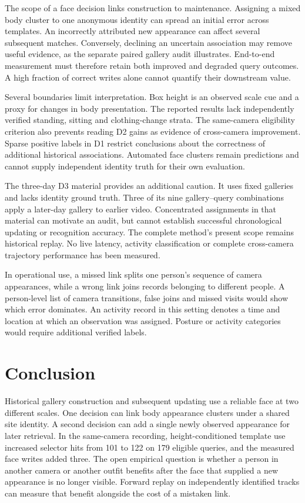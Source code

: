 \documentclass[journal,letterpaper]{IEEEtran}
\newcommand{\draftnote}[3]{\par\smallskip\noindent{\footnotesize
  \textcolor{editink}{\sffamily\bfseries [#2 #1]}\enspace
  \textcolor{editink}{#3}\par}\smallskip}
\newcommand{\expgap}[2]{\draftnote{EXPERIMENT}{#1}{#2}}
\begin{document}
The scope of a face decision links construction to maintenance. Assigning a mixed body cluster to one anonymous identity can spread an initial error across templates. An incorrectly attributed new appearance can affect several subsequent matches. Conversely, declining an uncertain association may remove useful evidence, as the separate paired gallery audit illustrates. End-to-end measurement must therefore retain both improved and degraded query outcomes. A high fraction of correct writes alone cannot quantify their downstream value.

Several boundaries limit interpretation. Box height is an observed scale cue and a proxy for changes in body presentation. The reported results lack independently verified standing, sitting and clothing-change strata. The same-camera eligibility criterion also prevents reading D2 gains as evidence of cross-camera improvement. Sparse positive labels in D1 restrict conclusions about the correctness of additional historical associations. Automated face clusters remain predictions and cannot supply independent identity truth for their own evaluation.

The three-day D3 material provides an additional caution. It uses fixed galleries and lacks identity ground truth. Three of its nine gallery--query combinations apply a later-day gallery to earlier video. Concentrated assignments in that material can motivate an audit, but cannot establish successful chronological updating or recognition accuracy. The complete method's present scope remains historical replay. No live latency, activity classification or complete cross-camera trajectory performance has been measured.
\expgap{E4}{Evaluate identity-consistent trajectories and camera-specific occurrence records against independent annotations, and measure latency on a named runtime only if claiming live operation.}

In operational use, a missed link splits one person's sequence of camera appearances, while a wrong link joins records belonging to different people. A person-level list of camera transitions, false joins and missed visits would show which error dominates. An activity record in this setting denotes a time and location at which an observation was assigned. Posture or activity categories would require additional verified labels.

\section{Conclusion}\label{sec:conclusion}
Historical gallery construction and subsequent updating use a reliable face at two different scales. One decision can link body appearance clusters under a shared site identity. A second decision can add a single newly observed appearance for later retrieval. In the same-camera recording, height-conditioned template use increased selector hits from 101 to 122 on 179 eligible queries, and the measured face writes added three. The open empirical question is whether a person in another camera or another outfit benefits after the face that supplied a new appearance is no longer visible. Forward replay on independently identified tracks can measure that benefit alongside the cost of a mistaken link.
\end{document}
